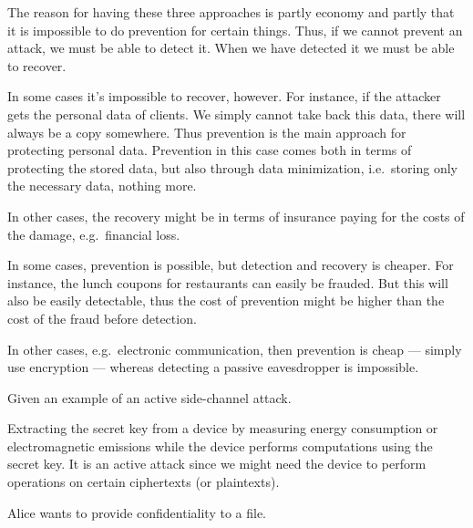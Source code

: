   \begin{solution}
    The reason for having these three approaches is partly economy and partly 
    that it is impossible to do prevention for certain things.
    Thus, if we cannot prevent an attack, we must be able to detect it.
    When we have detected it we must be able to recover.

    In some cases it's impossible to recover, however.
    For instance, if the attacker gets the personal data of clients.
    We simply cannot take back this data, there will always be a copy somewhere.
    Thus prevention is the main approach for protecting personal data.
    Prevention in this case comes both in terms of protecting the stored data, 
    but also through data minimization, i.e.\ storing only the necessary data, 
    nothing more.

    In other cases, the recovery might be in terms of insurance paying for the 
    costs of the damage, e.g.\ financial loss.

    In some cases, prevention is possible, but detection and recovery is 
    cheaper.
    For instance, the lunch coupons for restaurants can easily be frauded.
    But this will also be easily detectable, thus the cost of prevention might 
    be higher than the cost of the fraud before detection.

    In other cases, e.g.\ electronic communication, then prevention is cheap --- 
    simply use encryption --- whereas detecting a passive eavesdropper is 
    impossible.
  \end{solution}
\question[3]\label{q:sidechannels}
Given an example of an active side-channel attack.

\begin{solution}
  Extracting the secret key from a device by measuring energy consumption or 
  electromagnetic emissions while the device performs computations using the 
  secret key.
  It is an active attack since we might need the device to perform operations 
  on certain ciphertexts (or plaintexts).
\end{solution}


\question[3]
  Alice wants to provide confidentiality to a file.

